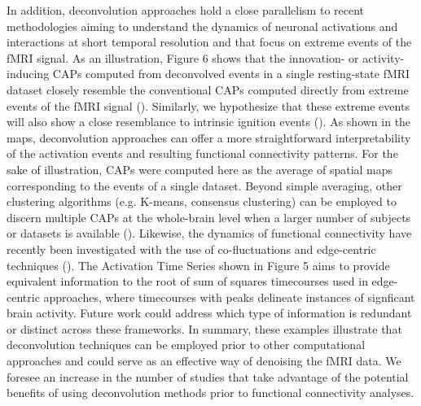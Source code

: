 In addition, deconvolution approaches hold a close parallelism to recent methodologies aiming to understand the dynamics of neuronal activations and interactions at short temporal resolution and that focus on extreme events of the fMRI signal. As an illustration, Figure 6 shows that the innovation- or activity-inducing CAPs computed from deconvolved events in a single resting-state fMRI dataset closely resemble the conventional CAPs computed directly from extreme events of the fMRI signal (\citealt{Liu2013Timevaryingfunctional,Liu2013Decompositionspontaneousbrain,Liu2018Coactivationpatterns,cifre2020revisiting,Cifre2020Furtherresultswhy,Zhang2020relationshipBOLDneural,Tagliazucchi2011,Tagliazucchi2012,Tagliazucchi2016,Rolls2021}). Similarly, we hypothesize that these extreme events will also show a close resemblance to intrinsic ignition events (\citealt{Deco2017a,Deco2017}). As shown in the maps, deconvolution approaches can offer a more straightforward interpretability of the activation events and resulting functional connectivity patterns. For the sake of illustration, CAPs were computed here as the average of spatial maps corresponding to the events of a single dataset. Beyond simple averaging, other clustering algorithms (e.g. K-means, consensus clustering) can be employed to discern multiple CAPs at the whole-brain level when a larger number of subjects or datasets is available (\citealt{Karahanoglu2015Transientbrainactivity}). Likewise, the dynamics of functional connectivity have recently been investigated with the use of co-fluctuations and edge-centric techniques (\citealt{Faskowitz2020,Esfahlani2020Highamplitudecofluctuations,Jo2021,Sporns2021,Oort2018}). The Activation Time Series shown in Figure 5 aims to provide equivalent information to the root of sum of squares timecourses used in edge-centric approaches, where timecourses with peaks delineate instances of signficant brain activity. Future work could address which type of information is redundant or distinct across these frameworks. In summary, these examples illustrate that deconvolution techniques can be employed prior to other computational approaches and could serve as an effective way of denoising the fMRI data. We foresee an increase in the number of studies that take advantage of the potential benefits of using deconvolution methods prior to functional connectivity analyses.

